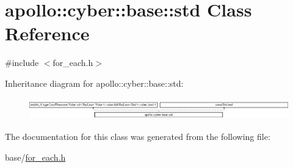 \hypertarget{classapollo_1_1cyber_1_1base_1_1std}{\section{apollo\-:\-:cyber\-:\-:base\-:\-:std Class Reference}
\label{classapollo_1_1cyber_1_1base_1_1std}
}


{\ttfamily \#include $<$for\-\_\-each.\-h$>$}

Inheritance diagram for apollo\-:\-:cyber\-:\-:base\-:\-:std\-:\begin{figure}[H]
\begin{center}
\leavevmode
\includegraphics[height=0.934891cm]{classapollo_1_1cyber_1_1base_1_1std}
\end{center}
\end{figure}


The documentation for this class was generated from the following file\-:\begin{DoxyCompactItemize}
\item 
base/\hyperlink{for__each_8h}{for\-\_\-each.\-h}\end{DoxyCompactItemize}
